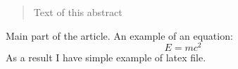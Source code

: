 \documentclass[]{article}
\title{}
\author{}
\begin{document}
\maketitle

\begin{abstract}
Text of this abstract
\end{abstract}
Main part of the article. An example of an equation:
\[E=mc^2\]
As a result I have simple example of latex file.
\end{document}

